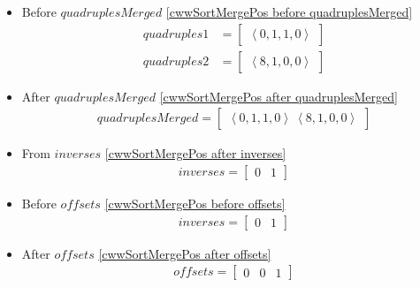 \begin{frame}[containsverbatim]{\cwwalgortihmexampleframe}
\begin{columns}[c]
\begin{column}{0.65\textwidth}
\begin{multicols}{2}
\begin{itemize}
                            \item Before $quadruplesMerged$ \cref{cwwSortMergePos before quadruplesMerged}
                            \begin{align*}
                                quadruples1 & = \begin{bmatrix}\left<0, 1, 1, 0\right>\end{bmatrix} \\
                                quadruples2 & = \begin{bmatrix}\left<8, 1, 0, 0\right>\end{bmatrix}
                            \end{align*}

                            \item After $quadruplesMerged$ \cref{cwwSortMergePos after quadruplesMerged}
                            \begin{align*}
                                quadruplesMerged = \begin{bmatrix}\left<0, 1, 1, 0\right> \ \left<8, 1, 0, 0\right>\end{bmatrix}
                            \end{align*}

                            \item From $inverses$ \cref{cwwSortMergePos after inverses}
                            \begin{align*}
                                inverses = \begin{bmatrix}0 & 1\end{bmatrix}
                            \end{align*}

                            \item Before $offsets$ \cref{cwwSortMergePos before offsets}
                            \begin{align*}
                                inverses = \begin{bmatrix}0 & 1\end{bmatrix}
                            \end{align*}

                            \item After $offsets$ \cref{cwwSortMergePos after offsets}
                            \begin{align*}
                                offsets = \begin{bmatrix}0 & 0 & 1\end{bmatrix}
                            \end{align*}


\end{itemize}
\end{multicols}
\end{column}
\end{columns}
\end{frame}
